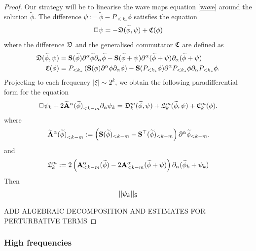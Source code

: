 \begin{proof}
	Our strategy will be to linearise the wave maps equation \eqref{wave} around the solution $\widetilde \phi$. The difference $\psi :=  \widetilde \phi - P_{\leq k_*} \phi$ satisfies the equation 
		\begin{equation}
			\Box \psi = - \mathfrak D (\widetilde \phi, \psi) + \mathfrak C(\phi)
			\label{eq:wavelow}
		\end{equation}
	where the difference $\mathfrak D$ and the generalised commutator $\mathfrak C$ are defined as 
		\begin{align*}
			\mathfrak D(\widetilde \phi, \psi) 
				&= {\bf S}  (\widetilde \phi) \partial^\alpha \widetilde\phi \partial_\alpha \widetilde\phi - {\bf S} (\widetilde \phi + \psi) \partial^\alpha (\widetilde \phi + \psi) \partial_\alpha (\widetilde\phi + \psi)\\
			\mathfrak C(\phi)
				&= P_{< k_*} \left( {\bf S}  (\phi) \partial^\alpha \phi \partial_\alpha \phi \right) - {\bf S}  (P_{< k_*} \phi) \partial^\alpha P_{< k_*} \phi \partial_\alpha P_{< k_*} \phi.	
		\end{align*}
	Projecting to each frequency $|\xi| \sim 2^k$, we obtain the following paradifferential form for the equation 	
		\begin{equation}
			\Box \psi_k + 2 {\widetilde {{\bf A}}^\alpha (\widetilde\phi)}_{< k - m} \partial_\alpha \psi_k = \mathfrak D_k^m (\widetilde \phi, \psi) + \mathfrak L_k^m (\widetilde \phi, \psi) + \mathfrak C_k^m (\phi).
			\label{eq:wavelowpara}
		\end{equation}	
	where
		\[
			{\widetilde {{\bf A}}^\alpha (\widetilde\phi)}_{< k - m} := \left( {\bf S} (\widetilde \phi)_{ <k - m} - {\bf S}^\top (\widetilde \phi)_{< k - m} \right) \partial^\alpha \widetilde \phi_{< k - m}.
		\]	
	and
		\[
			\mathfrak L^m_k 
				:= 2 \left( {\bf A}^\alpha_{< k - m} (\widetilde \phi) - 2 {\bf A}^\alpha_{< k - m} (\widetilde \phi + \psi) \right) \partial_\alpha (\widetilde \phi_k + \psi_k)
		\]		
	Then 
		\begin{equation}
			||\psi_k||_{\mathsf S} 
		\end{equation}	
		
	{\color{red} ADD ALGEBRAIC DECOMPOSITION AND ESTIMATES FOR PERTURBATIVE TERMS}	
\end{proof}




\subsubsection{High frequencies}

